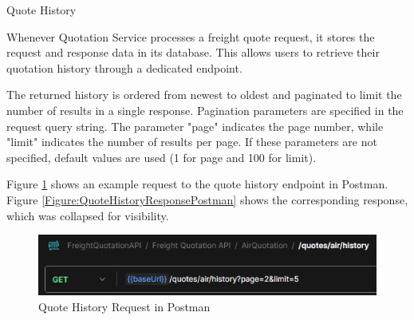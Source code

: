 \documentclass[12pt,reqno, oneside]{amsbook}
\makeatletter
\def\subsection{\@startsection{subsection}{2}%
      \z@{.5\linespacing\@plus.7\linespacing}{.25\linespacing}%
      {\normalfont\bfseries\flushleft}}
\theoremstyle{definition}
\theoremstyle{definition}
\numberwithin{section}{chapter}
\numberwithin{table}{chapter}
\numberwithin{figure}{chapter}
\makeatother
\begin{document}
\subsection{Quote History}
\label{Subsection:Quote_History}

Whenever Quotation Service processes a freight quote request, it stores the request and response data in its database. This allows users to retrieve their quotation history through a dedicated endpoint.

The returned history is ordered from newest to oldest and paginated to limit the number of results in a single response. Pagination parameters are specified in the request query string. The parameter "page" indicates the page number, while "limit" indicates the number of results per page. If these parameters are not specified, default values are used (1 for page and 100 for limit).

Figure \ref{Figure:QuoteHistoryRequestPostman} shows an example request to the quote history endpoint in Postman. Figure \ref{Figure:QuoteHistoryResponsePostman} shows the corresponding response, which was collapsed for visibility.

\begin{figure}[H]
  \centering
  \includegraphics[width=0.9\linewidth]{images/QuoteHistoryRequestPostman.png}
  \caption{\label{Figure:QuoteHistoryRequestPostman}Quote History Request in Postman}
\end{figure}
\end{document}
